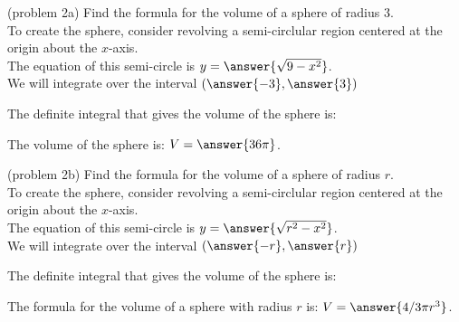 \documentclass{ximera}
\begin{document}
\begin{problem}(problem 2a)
Find the formula for the volume of a sphere of radius $3$.\\

To create the sphere, consider revolving a semi-circlular region centered at the origin about the $x$-axis.\\
The equation of this semi-circle is $y = \answer{\sqrt{9-x^2}}$.\\
We will integrate over the interval $\left(\answer{-3},\answer{3}\right)$

The definite integral that gives the volume of the sphere is:\\
\begin{multipleChoice}
\end{multipleChoice}

The volume of the sphere is: \;  $V = \answer{36 \pi }$.


\end{problem}



\begin{problem}(problem 2b)
Find the formula for the volume of a sphere of radius $r$.\\

To create the sphere, consider revolving a semi-circlular region centered at the origin about the $x$-axis.\\
The equation of this semi-circle is $y = \answer{\sqrt{r^2-x^2}}$.\\
We will integrate over the interval $\left(\answer{-r},\answer{r}\right)$

The definite integral that gives the volume of the sphere is:\\
\begin{multipleChoice}
\end{multipleChoice}

The formula for the volume of a sphere with radius $r$ is: \; $V = \answer{4/3 \pi r^3 }$.
\end{problem}
\end{document}
